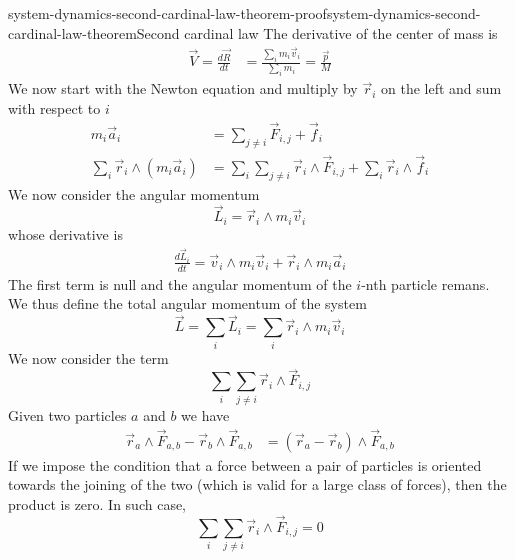 \documentclass[preview]{standalone}
\begin{document}
\begin{snippetproof}{system-dynamics-second-cardinal-law-theorem-proof}{system-dynamics-second-cardinal-law-theorem}{Second cardinal law}
    The derivative of the center of mass is
    \begin{align*}
        \vec{V} = \frac{d\vec{R}}{dt} &= \frac{\sum_i m_i\vec{v}_i}{\sum_i m_i} = \frac{\vec{p}}{M}
    \end{align*}
    We now start with the Newton equation and multiply by \(\vec{r}_i\) on the left
    and sum with respect to \(i\)
    \begin{align*}
        m_i\vec{a}_i &= \sum_{j \neq i} \vec{F}_{i,j} + \vec{f}_{i} \\
        \sum_i \vec{r}_i \wedge (m_i\vec{a}_i) &= \sum_i \sum_{j \neq i} \vec{r}_i \wedge \vec{F}_{i,j} + \sum_i \vec{r}_i \wedge \vec{f}_{i}
    \end{align*}
    We now consider the angular momentum
    \[
        \vec{L}_i = \vec{r}_i \wedge m_i \vec{v}_i
    \]
    whose derivative is
    \begin{align*}
        \frac{d\vec{L}_i}{dt} = \vec{v}_i \wedge m_i\vec{v}_i + \vec{r}_i \wedge m_i\vec{a}_i
    \end{align*}
    The first term is null and the angular momentum of the \(i\)-nth particle remans.
    We thus define the total angular momentum of the system
    \[
        \vec{L} = \sum_i \vec{L}_i = \sum_i \vec{r}_i \wedge m_i\vec{v}_i
    \]
    We now consider the term
    \[
        \sum_i \sum_{j\neq i} \vec{r}_i \wedge \vec{F}_{i,j}
    \]
    Given two particles \(a\) and \(b\) we have
    \begin{align*}
        \vec{r}_a \wedge \vec{F}_{a,b} - \vec{r}_b \wedge \vec{F}_{a,b}
        &= (\vec{r}_a - \vec{r}_b) \wedge \vec{F}_{a,b}
    \end{align*}
    If we impose the condition that a force between a pair of particles is oriented
    towards the joining of the two (which is valid for a large class of forces),
    then the product is zero.
    In such case,
    \[
        \sum_i \sum_{j\neq i} \vec{r}_i \wedge \vec{F}_{i,j} = 0
    \]
\end{snippetproof}
\end{document}
